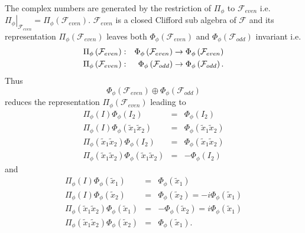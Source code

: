 \documentclass[aps,preprint]{revtex4}
\begin{document}
The complex numbers are generated by the restriction of $\Pi _{\phi }$ to $%
\mathcal{F}_{even}$ i.e. $\left. \Pi _{\phi }\right\vert _{\mathcal{F}%
_{even}}=\Pi _{\phi }\left( \mathcal{F}_{even}\right) .$ $\mathcal{F}_{even}$
is a closed Clifford sub algebra of $\mathcal{F}$ and its representation $%
\Pi _{\phi }\left( \mathcal{F}_{even}\right) $ leaves both $\Phi _{\phi
}\left( \mathcal{F}_{even}\right) $ and $\Phi _{\phi }\left( \mathcal{F}%
_{odd}\right) $ invariant i.e. 
\begin{eqnarray}
\Pi _{\phi }\left( \mathcal{F}_{even}\right) &:&\Phi _{\phi }\left( \mathcal{%
F}_{even}\right) \rightarrow \Phi _{\phi }\left( \mathcal{F}_{even}\right) \\
\Pi _{\phi }\left( \mathcal{F}_{even}\right) &:&\Phi _{\phi }\left( \mathcal{%
F}_{odd}\right) \rightarrow \Phi _{\phi }\left( \mathcal{F}_{odd}\right) .
\end{eqnarray}%
Thus 
\begin{equation}
\Phi _{\phi }\left( \mathcal{F}_{even}\right) \oplus \Phi _{\phi }\left( 
\mathcal{F}_{odd}\right)
\end{equation}%
reduces the representation $\Pi _{\phi }\left( \mathcal{F}_{even}\right) $
leading to 
\begin{eqnarray}
\Pi _{\phi }\left( I\right) \Phi _{\phi }\left( I_{2}\right) &=&\Phi _{\phi
}\left( I_{2}\right) \\
\Pi _{\phi }\left( I\right) \Phi _{\phi }\left( \widetilde{x}_{1}\widetilde{x%
}_{2}\right) &=&\Phi _{\phi }\left( \widetilde{x}_{1}\widetilde{x}_{2}\right)
\\
\Pi _{\phi }\left( \widetilde{x}_{1}\widetilde{x}_{2}\right) \Phi _{\phi
}\left( I_{2}\right) &=&\Phi _{\phi }\left( \widetilde{x}_{1}\widetilde{x}%
_{2}\right) \\
\Pi _{\phi }\left( \widetilde{x}_{1}\widetilde{x}_{2}\right) \Phi _{\phi
}\left( \widetilde{x}_{1}\widetilde{x}_{2}\right) &=&-\Phi _{\phi }\left(
I_{2}\right)
\end{eqnarray}%
and 
\begin{eqnarray}
\Pi _{\phi }\left( I\right) \Phi _{\phi }\left( \widetilde{x}_{1}\right)
&=&\Phi _{\phi }\left( \widetilde{x}_{1}\right) \\
\Pi _{\phi }\left( I\right) \Phi _{\phi }\left( \widetilde{x}_{2}\right)
&=&\Phi _{\phi }\left( \widetilde{x}_{2}\right) =-i\Phi _{\phi }\left( 
\widetilde{x}_{1}\right) \\
\Pi _{\phi }\left( \widetilde{x}_{1}\widetilde{x}_{2}\right) \Phi _{\phi
}\left( \widetilde{x}_{1}\right) &=&-\Phi _{\phi }\left( \widetilde{x}%
_{2}\right) =i\Phi _{\phi }\left( \widetilde{x}_{1}\right) \\
\Pi _{\phi }\left( \widetilde{x}_{1}\widetilde{x}_{2}\right) \Phi _{\phi
}\left( \widetilde{x}_{2}\right) &=&\Phi _{\phi }\left( \widetilde{x}%
_{1}\right) .
\end{eqnarray}%
\end{document}

